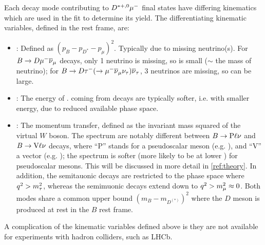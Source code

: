 Each decay mode contributing to ${D}^{*+,0}{\mu^-}$ final states have differing
kinematics which are used in the fit to determine its yield.
The differentiating kinematic variables, defined in the \B rest frame, are:
\begin{itemize}
    \item \mmSq: Defined as $(p_B - p_{D^{*}} - p_\mu)^2$.
        Typically due to missing neutrino(s).
        For $B \rightarrow D {\mu^-} {{\overline{\nu}}_\mu}$ decays, only 1 neutrino is missing,
        so \mmSq is small ($\sim$ the mass of neutrino);
        for $B \rightarrow D {\tau^-} (\rightarrow {\ensuremath{\mu^-}}{\ensuremath{{\overline{\nu}}_\mu}}{\ensuremath{{\nu}_\tau}}) {{\overline{\nu}}_\tau}$,
        3 neutrinos are missing, so \mmSq can be large.
    \item \el: The energy of \mun. \mun coming from \taum decays are typically
        softer, i.e. with smaller energy, due to reduced available phase space.
    \item \qSq: The momentum transfer, defined as the invariant mass squared
        of the virtual $W$ boson.
        The \qSq spectrum are notably different between
        $B \rightarrow \text{P} \ell{\ensuremath{\nu}}$ and $B \rightarrow \text{V} \ell{\ensuremath{\nu}}$
        decays, where ``P'' stands for a pseudoscalar meson (e.g. \Dz),
        and ``V'' a vector (e.g. \Dstar);
        the \qSq spectrum is softer
        (more likely to be at lower \qSq) for pseudoscalar mesons.
        This will be discussed in more detail in \cref{ref:theory}.
        In addition, the semitauonic decays are restricted to the phase space
        where $q^2 > m^2_\tau$,
        whereas the semimuonic decays extend down to $q^2 > m^2_\mu \approx 0$.
        Both modes share a common \qSq upper bound $(m_B - m_{D^{(*)}})^2$
        where the $D$ meson is produced at rest in the $B$ rest frame.
\end{itemize}
A complication of the kinematic variables defined above is they are not
available for experiments with hadron colliders, such as LHCb.
